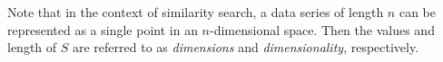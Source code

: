 Note that in the context of similarity search, a data series of length $n$ can be represented as a single point in an $n$-dimensional space. %
Then the values and length of $S$ are referred to as \emph{dimensions} and \emph{dimensionality}, respectively.

%



